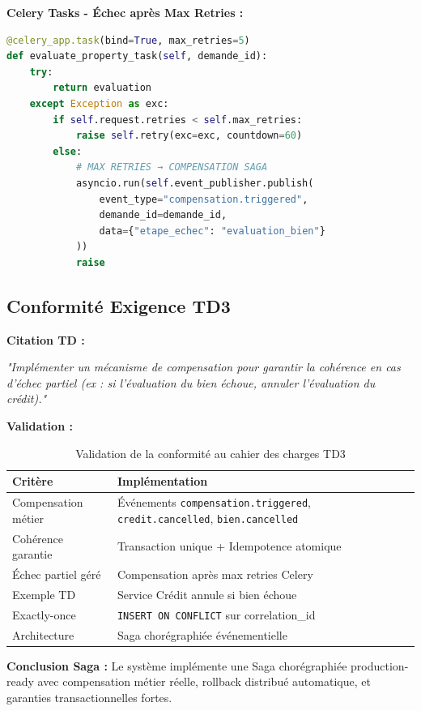 \documentclass[12pt,a4paper]{article}
\begin{document}
\textbf{Celery Tasks - Échec après Max Retries :}

\begin{lstlisting}[language=Python]
@celery_app.task(bind=True, max_retries=5)
def evaluate_property_task(self, demande_id):
    try:
        return evaluation
    except Exception as exc:
        if self.request.retries < self.max_retries:
            raise self.retry(exc=exc, countdown=60)
        else:
            # MAX RETRIES → COMPENSATION SAGA
            asyncio.run(self.event_publisher.publish(
                event_type="compensation.triggered",
                demande_id=demande_id,
                data={"etape_echec": "evaluation_bien"}
            ))
            raise
\end{lstlisting}

\subsection{Conformité Exigence TD3}

\textbf{Citation TD :}

\textit{"Implémenter un mécanisme de compensation pour garantir la cohérence en cas d'échec partiel (ex : si l'évaluation du bien échoue, annuler l'évaluation du crédit)."}

\textbf{Validation :}

\begin{table}[H]
\centering
\small
\begin{tabular}{lp{8cm}}
\toprule
\textbf{Critère} & \textbf{Implémentation} \\
\midrule
Compensation métier & Événements \texttt{compensation.triggered}, \texttt{credit.cancelled}, \texttt{bien.cancelled} \\
Cohérence garantie & Transaction unique + Idempotence atomique \\
Échec partiel géré & Compensation après max retries Celery \\
Exemple TD & Service Crédit annule si bien échoue \\
Exactly-once & \texttt{INSERT ON CONFLICT} sur correlation\_id \\
Architecture & Saga chorégraphiée événementielle \\
\bottomrule
\end{tabular}
\caption{Validation de la conformité au cahier des charges TD3}
\end{table}

\textbf{Conclusion Saga :} Le système implémente une Saga chorégraphiée production-ready avec compensation métier réelle, rollback distribué automatique, et garanties transactionnelles fortes.
\end{document}
